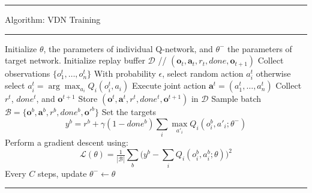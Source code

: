 \documentclass[varwidth, border=6pt]{standalone}
\begin{document}
\begingroup
\small                    %
\begin{center}
  \begin{minipage}{0.99\linewidth} %
    \hrule height 0.7pt
    \vspace{3pt}
    Algorithm: VDN Training
    \vspace{3pt}
    \hrule height 0.7pt
    \vspace{6pt}

    \begin{algorithmic}[1]
      \State Initialize $\theta$, the parameters of individual Q-network, and $\theta^-$ the parameters of target network.
      \State Initialize replay buffer $\mathcal{D}$ // $(\mathbf{o}_t,\mathbf{a}_t,r_t,done,\mathbf{o}_{t+1})$
        \State Collect observations $\{o^t_1,\dots,o^t_n\}$
          \State With probability $\epsilon$, select random action $a_i^t$
          \State otherwise select $a_i^t = \arg\max_{a_i} Q_i(o^t_i,a_i)$
        \EndFor
        \State Execute joint action $\mathbf{a}^t = (a_1^t,\dots,a_n^t)$
        \State Collect $r^t$, $done^t$, and $\mathbf{o}^{t+1}$
        \State Store $(\mathbf{o}^t,\mathbf{a}^t,r^t,done^t,\mathbf{o}^{t+1})$ in $\mathcal{D}$
          \State Sample batch $\mathcal{B} = \{\mathbf{o}^b,\mathbf{a}^b,r^b,done^b,\mathbf{o'}^{b}\}$
          \State Set the targets
          \Statex
          \[
            y^b = r^b + \gamma (1 - done^b)\sum_i \max_{a'_i} Q_i(o_i^b,a'_i;\theta^-)
          \]
          \State Perform a gradient descent using:
          \Statex
          \[
            \mathcal{L}(\theta)=\tfrac{1}{|\mathcal{B}|}\sum_b\Big(y^b-\sum_i Q_i(o_i^b,a_i^b;\theta)\Big)^2
          \]
          \State Every $C$ steps, update $\theta^- \leftarrow \theta$
        \EndIf
      \EndWhile
    \end{algorithmic}

    \vspace{6pt}
    \hrule height 0.7pt
  \end{minipage}
\end{center}
\endgroup
\end{document}
